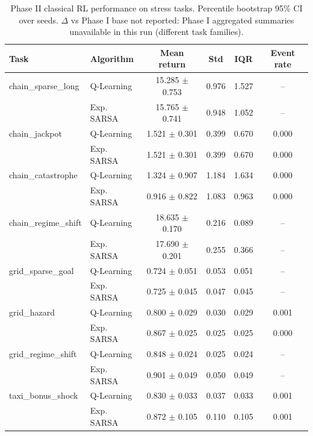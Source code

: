 \begin{table}[t]
\centering
\caption{Phase II classical RL performance on stress tasks.  Percentile bootstrap 95\% CI over seeds.  $\Delta$ vs Phase I base not reported: Phase I aggregated summaries unavailable in this run (different task families).}
\label{tab:p2c}
\begin{tabular}{llcccc}
\toprule
Task & Algorithm & Mean return & Std & IQR & Event rate \\
\midrule
  chain\_sparse\_long & Q-Learning & 15.285 $\pm$ 0.753 & 0.976 & 1.527 & -- \\
   & Exp. SARSA & 15.765 $\pm$ 0.741 & 0.948 & 1.052 & -- \\
\midrule
  chain\_jackpot & Q-Learning & 1.521 $\pm$ 0.301 & 0.399 & 0.670 & 0.000 \\
   & Exp. SARSA & 1.521 $\pm$ 0.301 & 0.399 & 0.670 & 0.000 \\
\midrule
  chain\_catastrophe & Q-Learning & 1.324 $\pm$ 0.907 & 1.184 & 1.634 & 0.000 \\
   & Exp. SARSA & 0.916 $\pm$ 0.822 & 1.083 & 0.963 & 0.000 \\
\midrule
  chain\_regime\_shift & Q-Learning & 18.635 $\pm$ 0.170 & 0.216 & 0.089 & -- \\
   & Exp. SARSA & 17.690 $\pm$ 0.201 & 0.255 & 0.366 & -- \\
\midrule
  grid\_sparse\_goal & Q-Learning & 0.724 $\pm$ 0.051 & 0.053 & 0.051 & -- \\
   & Exp. SARSA & 0.725 $\pm$ 0.045 & 0.047 & 0.045 & -- \\
\midrule
  grid\_hazard & Q-Learning & 0.800 $\pm$ 0.029 & 0.030 & 0.029 & 0.001 \\
   & Exp. SARSA & 0.867 $\pm$ 0.025 & 0.025 & 0.025 & 0.000 \\
\midrule
  grid\_regime\_shift & Q-Learning & 0.848 $\pm$ 0.024 & 0.025 & 0.024 & -- \\
   & Exp. SARSA & 0.901 $\pm$ 0.049 & 0.050 & 0.049 & -- \\
\midrule
  taxi\_bonus\_shock & Q-Learning & 0.830 $\pm$ 0.033 & 0.037 & 0.033 & 0.001 \\
   & Exp. SARSA & 0.872 $\pm$ 0.105 & 0.110 & 0.105 & 0.001 \\
\bottomrule
\end{tabular}
\end{table}
